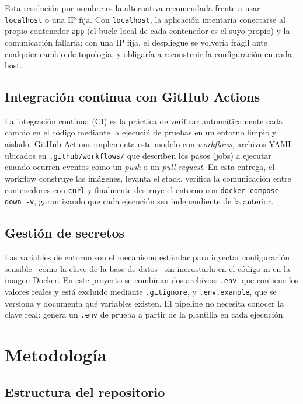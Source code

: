 \documentclass[12pt,a4paper]{article}
\begin{document}
Esta resoluci\'on por nombre es la alternativa recomendada frente a usar \texttt{localhost}
o una IP fija. Con \texttt{localhost}, la aplicaci\'on intentar\'ia conectarse al propio
contenedor \texttt{app} (el bucle local de cada contenedor es el suyo propio) y la
comunicaci\'on fallar\'ia; con una IP fija, el despliegue se volver\'ia frágil ante
cualquier cambio de topolog\'ia, y obligar\'ia a reconstruir la configuraci\'on en cada
host.

\subsection{Integraci\'on continua con GitHub Actions}

La integraci\'on continua (CI) es la pr\'actica de verificar autom\'aticamente cada cambio
en el c\'odigo mediante la ejecuci\'n de pruebas en un entorno limpio y aislado.
GitHub Actions implementa este modelo con \emph{workflows}, archivos YAML ubicados en
\texttt{.github/workflows/} que describen los pasos (jobs) a ejecutar cuando ocurren eventos
como un \emph{push} o un \emph{pull request}. En esta entrega, el workflow construye las
im\'agenes, levanta el stack, verifica la comunicaci\'on entre contenedores con
\texttt{curl} y finalmente destruye el entorno con \texttt{docker compose down -v},
garantizando que cada ejecuci\'on sea independiente de la anterior.

\subsection{Gesti\'on de secretos}

Las variables de entorno son el mecanismo est\'andar para inyectar configuraci\'on sensible
--como la clave de la base de datos-- sin incrustarla en el c\'odigo ni en la imagen
Docker. En este proyecto se combinan dos archivos: \texttt{.env}, que contiene los valores
reales y est\'a excluido mediante \texttt{.gitignore}, y \texttt{.env.example}, que se
versiona y documenta qu\'e variables existen. El pipeline no necesita conocer la clave
real: genera un \texttt{.env} de prueba a partir de la plantilla en cada ejecuci\'on.

\section{Metodolog\'ia}

\subsection{Estructura del repositorio}
\end{document}
